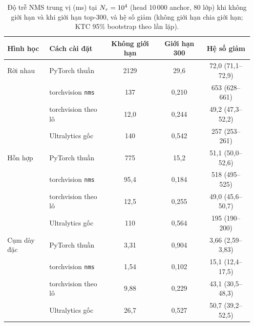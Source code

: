 \begin{table}[t]
\centering\small
\caption{Độ trễ NMS trung vị (ms) tại $N_{\tau}=10^4$ (head 10\,000 anchor, 80 lớp) khi không giới hạn và khi giới hạn top-300, và hệ số giảm (không giới hạn chia giới hạn; KTC 95\% bootstrap theo lần lặp).}
\label{tab:cap}
\begin{tabular}{@{}llccc@{}}
\toprule
Hình học & Cách cài đặt & Không giới hạn & Giới hạn 300 & Hệ số giảm \\
\midrule
Rời nhau & PyTorch thuần & 2129 & 29,6 & 72,0 (71,1--72,9) \\
 & torchvision \texttt{nms} & 137 & 0,210 & 653 (628--661) \\
 & torchvision theo lô & 12,0 & 0,244 & 49,2 (47,3--52,2) \\
 & Ultralytics gốc & 140 & 0,542 & 257 (253--261) \\
Hỗn hợp & PyTorch thuần & 775 & 15,2 & 51,1 (50,0--52,6) \\
 & torchvision \texttt{nms} & 95,4 & 0,184 & 518 (495--525) \\
 & torchvision theo lô & 12,5 & 0,255 & 49,0 (45,6--50,7) \\
 & Ultralytics gốc & 110 & 0,564 & 195 (190--200) \\
Cụm dày đặc & PyTorch thuần & 3,31 & 0,904 & 3,66 (2,59--3,83) \\
 & torchvision \texttt{nms} & 1,54 & 0,102 & 15,1 (12,4--17,5) \\
 & torchvision theo lô & 9,88 & 0,229 & 43,1 (30,5--48,3) \\
 & Ultralytics gốc & 26,7 & 0,527 & 50,7 (39,2--52,5) \\
\bottomrule
\end{tabular}
\end{table}
